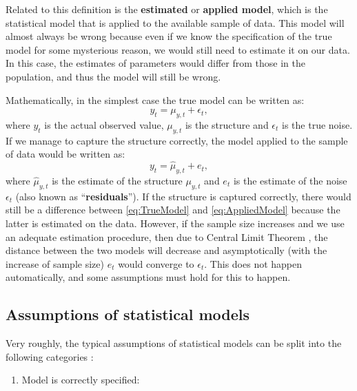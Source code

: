 \documentclass[
]{book}
\providecommand{\tightlist}{%
  \setlength{\itemsep}{0pt}\setlength{\parskip}{0pt}}
\theoremstyle{definition}
\theoremstyle{definition}
\theoremstyle{definition}
\theoremstyle{definition}
\theoremstyle{remark}
\begin{document}
Related to this definition is the \textbf{estimated} or \textbf{applied model}, which is the statistical model that is applied to the available sample of data. This model will almost always be wrong because even if we know the specification of the true model for some mysterious reason, we would still need to estimate it on our data. In this case, the estimates of parameters would differ from those in the population, and thus the model will still be wrong.

Mathematically, in the simplest case the true model can be written as:
\begin{equation}
    y_t = \mu_{y,t} + \epsilon_t,
    \label{eq:TrueModel}
\end{equation}
where \(y_t\) is the actual observed value, \(\mu_{y,t}\) is the structure and \(\epsilon_t\) is the true noise. If we manage to capture the structure correctly, the model applied to the sample of data would be written as:
\begin{equation}
    y_t = \hat{\mu}_{y,t} + e_t,
    \label{eq:AppliedModel}
\end{equation}
where \(\hat{\mu}_{y,t}\) is the estimate of the structure \(\mu_{y,t}\) and \(e_t\) is the estimate of the noise \(\epsilon_t\) (also known as ``\textbf{residuals}''). If the structure is captured correctly, there would still be a difference between \eqref{eq:TrueModel} and \eqref{eq:AppliedModel} because the latter is estimated on the data. However, if the sample size increases and we use an adequate estimation procedure, then due to Central Limit Theorem \citep[see Chapter 4 of][]{SvetunkovSBA}, the distance between the two models will decrease and asymptotically (with the increase of sample size) \(e_t\) would converge to \(\epsilon_t\). This does not happen automatically, and some assumptions must hold for this to happen.

\hypertarget{assumptions}{%
\subsection{Assumptions of statistical models}\label{assumptions}}

Very roughly, the typical assumptions of statistical models can be split into the following categories \citep{SvetunkovSBA}:

\begin{enumerate}
\def\labelenumi{\arabic{enumi}.}
\tightlist
\item
  Model is correctly specified:
\end{enumerate}
\end{document}
